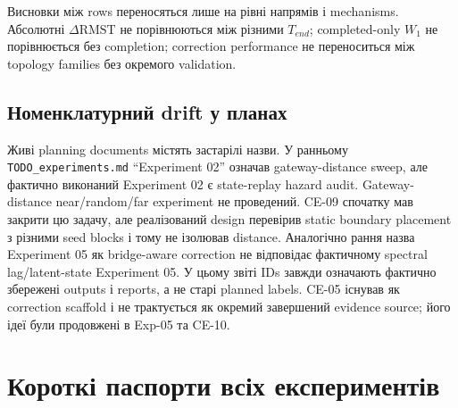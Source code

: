 \documentclass[11pt,a4paper]{article}
\begin{document}
Висновки між rows переносяться лише на рівні напрямів і mechanisms. Абсолютні
$\Delta\mathrm{RMST}$ не порівнюються між різними $T_{end}$; completed-only
$W_1$ не порівнюється без completion; correction performance не переноситься
між topology families без окремого validation.

\subsection{Номенклатурний drift у планах}

Живі planning documents містять застарілі назви. У ранньому
\texttt{TODO\_experiments.md} ``Experiment 02'' означав gateway-distance sweep,
але фактично виконаний Experiment 02 є state-replay hazard audit. Gateway-distance
near/random/far experiment не проведений. CE-09 спочатку мав закрити цю задачу,
але реалізований design перевірив static boundary placement з різними seed
blocks і тому не ізолював distance. Аналогічно рання назва Experiment 05 як
bridge-aware correction не відповідає фактичному spectral lag/latent-state
Experiment 05. У цьому звіті IDs завжди означають фактично збережені outputs і
reports, а не старі planned labels. CE-05 існував як correction scaffold і не
трактується як окремий завершений evidence source; його ідеї були продовжені в
Exp-05 та CE-10.

\section{Короткі паспорти всіх експериментів}
\end{document}
